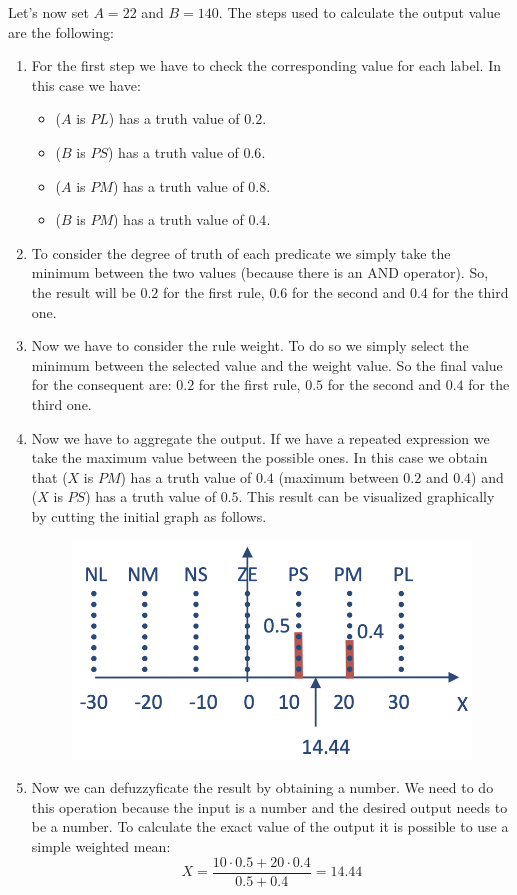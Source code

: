 \documentclass[12pt, a4paper]{report}
\newtheorem[L]{theorem}{Theorem}
\newtheorem[M]{corollary}{Corollary}
\newtheorem[M]{lemma}{Lemma}
\newtheorem[style=S,bodystyle=\normalfont]{definition}{Definition}
\begin{document}
\begin{example}
        Let's now set $A=22$ and $B=140$. The steps used to calculate the output value are the following:
        \begin{enumerate}
            \item For the first step we have to check the corresponding value for each label. In this case we have:
                \begin{itemize}
                    \item ($A$ is $PL$) has a truth value of $0.2$.
                    \item ($B$ is $PS$) has a truth value of $0.6$.
                    \item ($A$ is $PM$) has a truth value of $0.8$.
                    \item ($B$ is $PM$) has a truth value of $0.4$.
                \end{itemize}
            \item To consider the degree of truth of each predicate we simply take the minimum between the two values (because there is an AND 
                operator). So, the result will be $0.2$ for the first rule, $0.6$ for the second and $0.4$ for the third one.
            \item Now we have to consider the rule weight. To do so we simply select the minimum between the selected value and the weight value.
                So the final value for the consequent are: $0.2$ for the first rule, $0.5$ for the second and $0.4$ for the third one. 
            \item  Now we have to aggregate the output. If we have a repeated expression we take the maximum value between the possible ones. 
                In this case we obtain that ($X$ is $PM$) has a truth value of $0.4$ (maximum between $0.2$ and $0.4$) and ($X$ is $PS$) has a 
                truth value of $0.5$. This result can be visualized graphically by cutting the initial graph as follows.
                \begin{figure}[H]
                    \centering
                    \includegraphics[width=0.5\linewidth]{images/cut.png}
                \end{figure}
            \item Now we can defuzzyficate the result by obtaining a number. We need to do this operation because the input is a number and the 
            desired output needs to be a number. To calculate the exact value of the output it is possible to use a simple weighted mean: 
            \[X=\frac{10 \cdot 0.5 + 20 \cdot 0.4}{0.5+0.4}=14.44\]
        \end{enumerate}
    \end{example}
\end{document}
